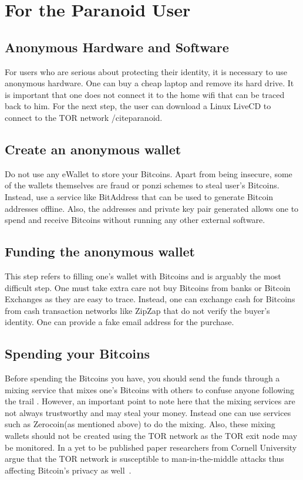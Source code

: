 \section{For the Paranoid User}
\subsection{Anonymous Hardware and Software}
For users who are serious about protecting their identity, it is necessary to use anonymous hardware. One can buy a cheap laptop and remove its hard drive. It is important that one does not connect it to the home wifi that can be traced back to him. For the next step, the user can download a Linux LiveCD to connect to the TOR network /cite{paranoid}. 

\subsection{Create an anonymous wallet}
Do not use any eWallet to store your Bitcoins. Apart from being insecure, some of the wallets themselves are fraud or ponzi schemes to steal user’s Bitcoins. Instead, use a service like BitAddress \cite{bitaddress} that can be used to generate Bitcoin addresses offline. Also, the addresses and private key pair generated allows one to spend and receive Bitcoins without running any other external software.

\subsection{Funding the anonymous wallet}
This step refers to filling one’s wallet with Bitcoins and is arguably the most difficult step. One must take extra care not buy Bitcoins from banks or Bitcoin Exchanges as they are easy to trace. Instead, one can exchange cash for Bitcoins from cash transaction networks like ZipZap \cite{zip} that do not verify the buyer’s identity. One can provide a fake email address for the purchase.

\subsection{Spending your Bitcoins}
Before spending the Bitcoins you have, you should send the
funds through a mixing service that mixes one’s Bitcoins with
others to confuse anyone following the trail \cite{mix}.
However, an important point to note here that the mixing
services are not always trustworthy and may steal your money.
Instead one can use services such as Zerocoin(as mentioned
above) to do the mixing. Also, these mixing wallets should
not be created using the TOR network as the TOR exit node may
be monitored. In a yet to be published paper researchers from
Cornell University argue that the TOR network is susceptible
to man-in-the-middle attacks thus affecting Bitcoin’s privacy
as well~\cite{badidea}.







